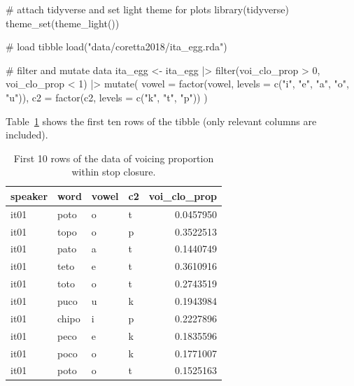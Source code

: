 \documentclass[
  authoryear,
  preprint,
  3p]{elsarticle}
\newenvironment{Shaded}{\begin{snugshade}}{\end{snugshade}}
\newcommand{\AttributeTok}[1]{\textcolor[rgb]{0.40,0.45,0.13}{#1}}
\newcommand{\CommentTok}[1]{\textcolor[rgb]{0.37,0.37,0.37}{#1}}
\newcommand{\DecValTok}[1]{\textcolor[rgb]{0.68,0.00,0.00}{#1}}
\newcommand{\FunctionTok}[1]{\textcolor[rgb]{0.28,0.35,0.67}{#1}}
\newcommand{\NormalTok}[1]{\textcolor[rgb]{0.00,0.23,0.31}{#1}}
\newcommand{\OtherTok}[1]{\textcolor[rgb]{0.00,0.23,0.31}{#1}}
\newcommand{\SpecialCharTok}[1]{\textcolor[rgb]{0.37,0.37,0.37}{#1}}
\newcommand{\StringTok}[1]{\textcolor[rgb]{0.13,0.47,0.30}{#1}}
\begin{document}
\begin{Shaded}
\begin{Highlighting}[]
\CommentTok{\# attach tidyverse and set light theme for plots}
\FunctionTok{library}\NormalTok{(tidyverse)}
\FunctionTok{theme\_set}\NormalTok{(}\FunctionTok{theme\_light}\NormalTok{())}

\CommentTok{\# load tibble}
\FunctionTok{load}\NormalTok{(}\StringTok{"data/coretta2018/ita\_egg.rda"}\NormalTok{)}

\CommentTok{\# filter and mutate data}
\NormalTok{ita\_egg }\OtherTok{\textless{}{-}}\NormalTok{ ita\_egg }\SpecialCharTok{|\textgreater{}} 
  \FunctionTok{filter}\NormalTok{(voi\_clo\_prop }\SpecialCharTok{\textgreater{}} \DecValTok{0}\NormalTok{, voi\_clo\_prop }\SpecialCharTok{\textless{}} \DecValTok{1}\NormalTok{) }\SpecialCharTok{|\textgreater{}} 
  \FunctionTok{mutate}\NormalTok{(}
    \AttributeTok{vowel =} \FunctionTok{factor}\NormalTok{(vowel, }\AttributeTok{levels =} \FunctionTok{c}\NormalTok{(}\StringTok{"i"}\NormalTok{, }\StringTok{"e"}\NormalTok{, }\StringTok{"a"}\NormalTok{, }\StringTok{"o"}\NormalTok{, }\StringTok{"u"}\NormalTok{)),}
    \AttributeTok{c2 =} \FunctionTok{factor}\NormalTok{(c2, }\AttributeTok{levels =} \FunctionTok{c}\NormalTok{(}\StringTok{"k"}\NormalTok{, }\StringTok{"t"}\NormalTok{, }\StringTok{"p"}\NormalTok{))}
\NormalTok{  )}
\end{Highlighting}
\end{Shaded}

Table~\ref{tbl-ita-egg} shows the first ten rows of the tibble (only
relevant columns are included).

\begin{longtable}[]{@{}llllr@{}}

\caption{\label{tbl-ita-egg}First 10 rows of the data of voicing
proportion within stop closure.}

\tabularnewline

\toprule\noalign{}
speaker & word & vowel & c2 & voi\_clo\_prop \\
\midrule\noalign{}
\endhead
\bottomrule\noalign{}
\endlastfoot
it01 & poto & o & t & 0.0457950 \\
it01 & topo & o & p & 0.3522513 \\
it01 & pato & a & t & 0.1440749 \\
it01 & teto & e & t & 0.3610916 \\
it01 & toto & o & t & 0.2743519 \\
it01 & puco & u & k & 0.1943984 \\
it01 & chipo & i & p & 0.2227896 \\
it01 & peco & e & k & 0.1835596 \\
it01 & poco & o & k & 0.1771007 \\
it01 & poto & o & t & 0.1525163 \\

\end{longtable}
\end{document}
